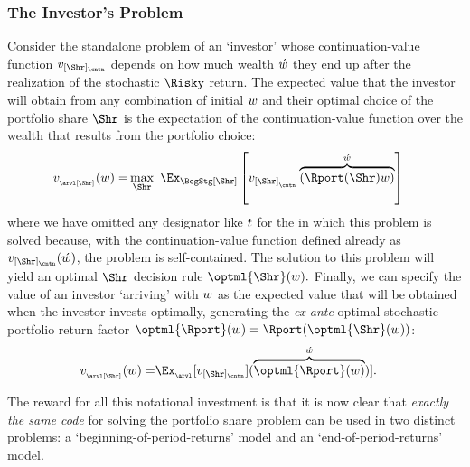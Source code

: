 \documentclass[SolvingMicroDSOPs]{subfiles}
\begin{document}
\hypertarget{subsubsec:investors-problem}{}
\subsubsection{The Investor's Problem}\label{subsubsec:investors-problem}

Consider the standalone problem of an `investor' whose continuation-value function $\vFunc_{[\Shr]_\cntn}$ depends on how much wealth $\acute{w}$ they end up after the realization of the stochastic $\Risky$ return.  The expected value that the investor will obtain from any combination of initial $w$ and their optimal choice of the portfolio share $\Shr$ is the expectation of the continuation-value function over the wealth that results from the portfolio choice:
\begin{equation}\begin{gathered}\begin{aligned}
  \vFunc_{_\arvl[\Shr]}(\wlthBefr)  = & \max_{\Shr}~ \Ex_{\BegStg[\Shr]}\left[\vFunc_{[\Shr]_{_\cntn}}\overbrace{\left(\Rport(\Shr){\wlthBefr}\right)}^{\wlthAftr}\right] \label{eq:vMidStgShr}
    \end{aligned}\end{gathered}\end{equation}
where we have omitted any {\interval} designator like $t$ for the {\interval} in which this problem is solved because, with the continuation-value function defined already as $\vFunc_{[\Shr]_\cntn}(\wlthAftr)$, the problem is self-contained.  The solution to this problem will yield an optimal $\Shr$ decision rule $\optml{\Shr}(\wlthBefr).$  Finally, we can specify the value of an investor `arriving' with $w$ as the expected value that will be obtained when the investor invests optimally, generating the \textit{ex ante} optimal stochastic portfolio return factor $\optml{\Rport}(\wlthBefr)=\Rport(\optml{\Shr}(\wlthBefr))$:
\begin{equation}\begin{gathered}\begin{aligned}
      \vFunc_{_\arvl[\Shr]}(\wlthBefr)  = & \Ex_{_\arvl}[\vFunc_{[\Shr]_\cntn}](\overbrace{\optml{\Rport}(\wlthBefr)}^{\wlthAftr})].
\end{aligned}\end{gathered}\end{equation}

The reward for all this notational investment is that it is now clear that \emph{exactly the same code} for solving the portfolio share problem can be used in two distinct problems: a `beginning-of-period-returns' model and an `end-of-period-returns' model.
\end{document}
